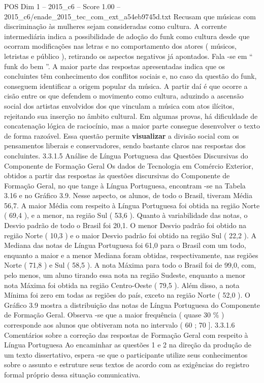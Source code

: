 \begin{textsample}{POS Dim 1 – 2015\_c6 – Score 1.00 – 2015\_c6/enade\_2015\_tec\_com\_ext\_a54eb9745d.txt}
Recusam que músicas com discriminação às mulheres sejam consideradas como cultura.
A corrente intermediária indica a possibilidade de adoção do funk como cultura desde que ocorram modificações nas letras e no comportamento dos atores ( músicos, letristas e público ), retirando os aspectos negativos já apontados.
Fala -se em “ funk do bem ”.
A maior parte das respostas apresentadas indica que os concluintes têm conhecimento dos conflitos sociais e, no caso da questão do funk, conseguem identificar a origem popular da música.
A partir daí é que ocorre a cisão entre os que defendem o movimento como cultura, aduzindo a ascensão social dos artistas envolvidos dos que vinculam a música com atos ilícitos, rejeitando sua inserção no âmbito cultural.
Em algumas provas, há dificuldade de concatenação lógica de raciocínio, mas a maior parte consegue desenvolver o texto de forma razoável.
Essa questão permite \textbf{visualizar} a divisão social com os pensamentos liberais e conservadores, sendo bastante claros nas respostas dos concluintes. 3.3.1.5 Análise de Língua Portuguesa das Questões Discursivas do Componente de Formação Geral Os dados de Tecnologia em Comércio Exterior, obtidos a partir das respostas às questões discursivas do Componente de Formação Geral, no que tange à Língua Portuguesa, encontram -se na Tabela 3.16 e no Gráfico 3.9.
Nesse aspecto, os alunos, de todo o Brasil, tiveram Média 56,7.
A maior Média com respeito à Língua Portuguesa foi obtida na região Norte ( 69,4 ), e a menor, na região Sul ( 53,6 ).
Quanto à variabilidade das notas, o Desvio padrão de todo o Brasil foi 20,1.
O menor Desvio padrão foi obtido na região Norte ( 10,3 ) e o maior Desvio padrão foi obtido na região Sul ( 22,2 ).
A Mediana das notas de Língua Portuguesa foi 61,0 para o Brasil com um todo, enquanto a maior e a menor Mediana foram obtidas, respectivamente, nas regiões Norte ( 71,8 ) e Sul ( 58,5 ).
A nota Máxima para todo o Brasil foi de 99,0, com, pelo menos, um aluno tirando essa nota na região Sudeste, enquanto a menor nota Máxima foi obtida na região Centro-Oeste ( 79,5 ).
Além disso, a nota Mínima foi zero em todas as regiões do país, exceto na região Norte ( 52,0 ).
O Gráfico 3.9 mostra a distribuição das notas de Língua Portuguesa do Componente de Formação Geral.
Observa -se que a maior frequência ( quase 30 \% ) corresponde aos alunos que obtiveram nota no intervalo ( 60 ; 70 ]. 3.3.1.6 Comentários sobre a correção das respostas de Formação Geral com respeito à Língua Portuguesa Ao encaminhar as questões 1 e 2 na direção da produção de um texto dissertativo, espera -se que o participante utilize seus conhecimentos sobre o assunto e estruture seus textos de acordo com as exigências do registro formal próprio dessa situação comunicativa.

\end{textsample}
